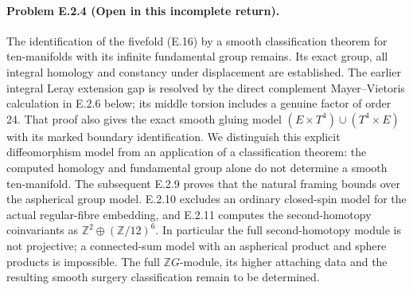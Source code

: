 \paragraph{Problem E.2.4 (Open in this incomplete return).}
The identification of the fivefold (E.16) by a smooth
classification theorem for ten-manifolds with its infinite
fundamental group remains.  Its exact group, all integral
homology and constancy under displacement are established.
The earlier integral Leray extension gap is resolved by the
direct complement Mayer--Vietoris calculation in E.2.6 below;
its middle torsion includes a genuine factor of order 24.
That proof also gives the exact smooth gluing model
$(E\times T^4)\cup(T^4\times E)$ with its marked boundary
identification.  We distinguish this explicit diffeomorphism
model from an application of a classification theorem: the
computed homology and fundamental group alone do not determine
a smooth ten-manifold.
The subsequent E.2.9 proves that the natural framing bounds
over the aspherical group model.  E.2.10 excludes an ordinary
closed-spin model for the actual regular-fibre embedding, and
E.2.11 computes the second-homotopy coinvariants as
$\mathbb Z^2\oplus(\mathbb Z/12)^6$.  In particular the full
second-homotopy module is not projective; a connected-sum model
with an aspherical product and sphere products is impossible.
The full $\mathbb ZG$-module, its higher attaching data and the
resulting smooth surgery classification remain to be determined.


